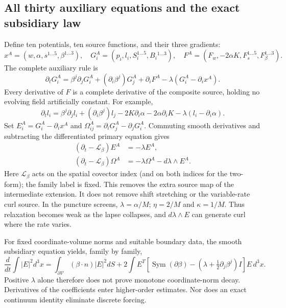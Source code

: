 \documentclass[11pt,letterpaper]{article}
\begin{document}
\subsection{All thirty auxiliary equations and the exact subsidiary law}
Define ten potentials, ten source functions, and their three gradients:
\begin{equation}
x^A=(w,\alpha,s^{1\ldots5},\beta^{1\ldots3}),\quad
G_i^A=(p_i,l_i,S_i^{1\ldots5},B_i{}^{1\ldots3}),\quad
F^A=(F_w,-2\alpha K,F_s^{1\ldots5},F_\beta^{1\ldots3}).
\end{equation}
The complete auxiliary rule is
\begin{equation}\boxed{
\partial_tG_i^A=\beta^j\partial_jG_i^A+(\partial_i\beta^j)G_j^A
+\partial_iF^A-\lambda(G_i^A-\partial_ix^A).}
\end{equation}
Every derivative of $F$ is a complete derivative of the composite source, holding no evolving field artificially constant. For example,
\begin{equation}
\partial_tl_i=\beta^j\partial_jl_i+(\partial_i\beta^j)l_j
-2K\partial_i\alpha-2\alpha\partial_iK-\lambda(l_i-\partial_i\alpha).
\end{equation}
Set $E_i^A=G_i^A-\partial_ix^A$ and $\Omega_{ij}^A=\partial_iG_j^A-\partial_jG_i^A$. Commuting smooth derivatives and subtracting the differentiated primary equation gives
\begin{align}
(\partial_t-\mathcal L_\beta)E^A&=-\lambda E^A,\\
(\partial_t-\mathcal L_\beta)\Omega^A&=-\lambda\Omega^A-d\lambda\wedge E^A.
\end{align}
Here $\mathcal L_\beta$ acts on the spatial covector index (and on both indices for the two-form); the family label is fixed. This removes the extra source map of the intermediate extension. It does not remove shift stretching or the variable-rate curl source. In the puncture screens, $\lambda=\alpha/M$; $\eta=2/M$ and $\kappa=1/M$. Thus relaxation becomes weak as the lapse collapses, and $d\lambda\wedge E$ can generate curl where the rate varies.

For fixed coordinate-volume norms and suitable boundary data, the smooth subsidiary equation yields, family by family,
\begin{equation}
\frac{d}{dt}\int |E|^2d^3x=
\int_{\partial\mathcal V}(\beta\cdot n)|E|^2dS+
2\int E^T\left[\operatorname{Sym}(\partial\beta)
-(\lambda+\tfrac12\partial_j\beta^j)I\right]E\,d^3x.
\end{equation}
Positive $\lambda$ alone therefore does not prove monotone coordinate-norm decay. Derivatives of the coefficients enter higher-order estimates. Nor does an exact continuum identity eliminate discrete forcing.
\end{document}
